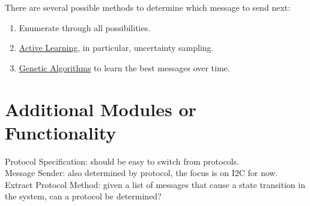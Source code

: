 \documentclass[11pt, a4paper]{article}
\begin{document}
There are several possible methods to determine which message to send next:
\begin{enumerate}
    \item Enumerate through all possibilities.
    \item \href{https://en.wikipedia.org/wiki/Active_learning_(machine_learning)}{Active Learning}, in particular, uncertainty sampling.
    \item \href{https://en.wikipedia.org/wiki/Genetic_algorithm}{Genetic Algorithms} to learn the best messages over time.
\end{enumerate}

\section*{Additional Modules or Functionality}
Protocol Specification: should be easy to switch from protocols. \\
Message Sender: also determined by protocol, the focus is on I2C for now.\\
Extract Protocol Method: given a list of messages that cause a state transition in the system, can a protocol be determined?
\end{document}
